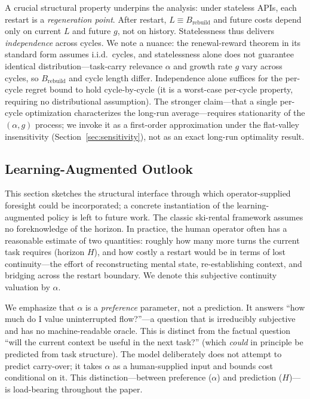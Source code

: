 \documentclass[11pt]{article}
\theoremstyle{definition}
\theoremstyle{remark}
\begin{document}
A crucial structural property underpins the analysis: under stateless APIs, each restart is a \emph{regeneration point}. After restart, $L \equiv B_{\text{rebuild}}$ and future costs depend only on current $L$ and future $g$, not on history. Statelessness thus delivers \emph{independence} across cycles. We note a nuance: the renewal-reward theorem in its standard form \citep{ross1996} assumes i.i.d.\ cycles, and statelessness alone does not guarantee identical distribution---task-carry relevance $\alpha$ and growth rate $g$ vary across cycles, so $B_{\text{rebuild}}$ and cycle length differ. Independence alone suffices for the per-cycle regret bound to hold cycle-by-cycle (it is a worst-case per-cycle property, requiring no distributional assumption). The stronger claim---that a single per-cycle optimization characterizes the long-run average---requires stationarity of the $(\alpha, g)$ process; we invoke it as a first-order approximation under the flat-valley insensitivity (Section~\ref{sec:sensitivity}), not as an exact long-run optimality result.

\subsection{Learning-Augmented Outlook}

This section sketches the structural interface through which operator-supplied foresight could be incorporated; a concrete instantiation of the learning-augmented policy is left to future work. The classic ski-rental framework assumes no foreknowledge of the horizon. In practice, the human operator often has a reasonable estimate of two quantities: roughly how many more turns the current task requires (horizon $H$), and how costly a restart would be in terms of lost continuity---the effort of reconstructing mental state, re-establishing context, and bridging across the restart boundary. We denote this subjective continuity valuation by $\alpha$.

We emphasize that $\alpha$ is a \emph{preference} parameter, not a prediction. It answers ``how much do I value uninterrupted flow?''---a question that is irreducibly subjective and has no machine-readable oracle. This is distinct from the factual question ``will the current context be useful in the next task?'' (which \emph{could} in principle be predicted from task structure). The model deliberately does not attempt to predict carry-over; it takes $\alpha$ as a human-supplied input and bounds cost conditional on it. This distinction---between preference ($\alpha$) and prediction ($H$)---is load-bearing throughout the paper.
\end{document}
